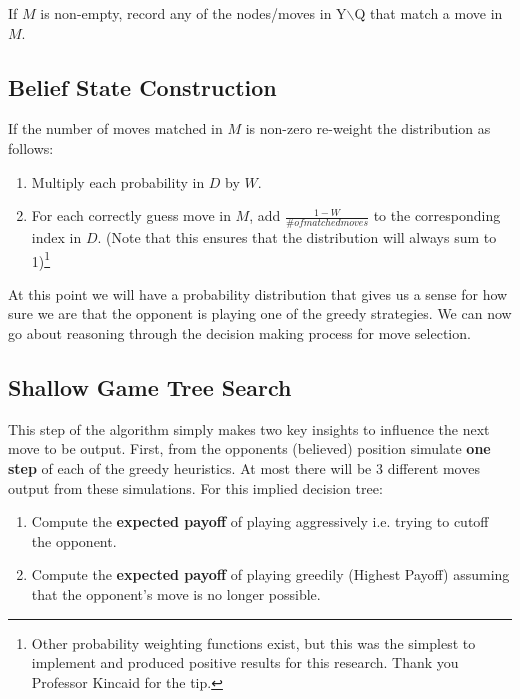 \documentclass[pageno]{jpaper}
\begin{document}
If $M$ is non-empty, record any of the nodes/moves in Y$\backslash$Q that match a move in $M$.

\subsection{Belief State Construction}

If the number of moves matched in $M$ is non-zero re-weight the distribution as follows:

\begin{enumerate}
	
	\item Multiply each probability in $D$ by $W$.
	\item For each correctly guess move in $M$, add $\frac{1 - W}{\# of matched moves}$ to the corresponding index in $D$. (Note that this ensures that the distribution will always sum to 1)\footnote{Other probability weighting functions exist, but this was the simplest to implement and produced positive results for this research. Thank you Professor Kincaid for the tip.}
\end{enumerate}


At this point we will have a probability distribution that gives us a sense for how sure we are that the opponent is playing one of the greedy strategies. We can now go about reasoning through the decision making process for move selection.

\subsection{Shallow Game Tree Search}

This step of the algorithm simply makes two key insights to influence the next move to be output. First, from the opponents (believed) position simulate \textbf{one step} of each of the greedy heuristics. At most there will be 3 different moves output from these simulations. For this implied decision tree:\newpage

\begin{enumerate}
	\item Compute the \textbf{expected payoff} of playing aggressively i.e. trying to cutoff the opponent.
	\item Compute the \textbf{expected payoff} of playing greedily (Highest Payoff) assuming that the opponent's move is no longer possible.\newline
\end{enumerate}
\end{document}
